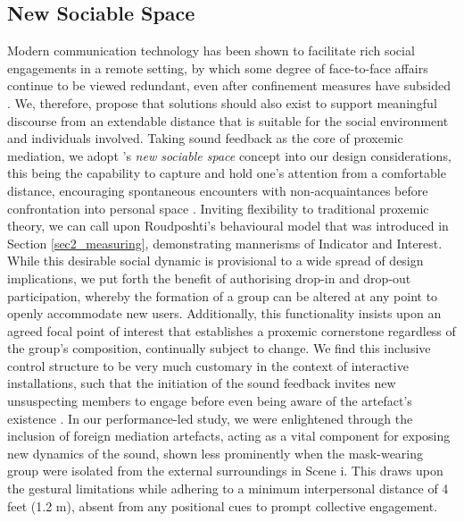 \subsection*{New Sociable Space}
Modern communication technology has been shown to facilitate rich social engagements in a remote setting, by which some degree of face-to-face affairs continue to be viewed redundant, even after confinement measures have subsided \citep{cotofan_work_2021}. We, therefore, propose that solutions should also exist to support meaningful discourse from an extendable distance that is suitable for the social environment and individuals involved. Taking sound feedback as the core of proxemic mediation, we adopt \citeauthor{mehta_new_2020}'s \textit{new sociable space} concept into our design considerations, this being the capability to capture and hold one's attention from a comfortable distance, encouraging spontaneous encounters with non-acquaintances before confrontation into personal space \cite{mehta_new_2020}. Inviting flexibility to traditional proxemic theory, we can call upon Roudposhti's behavioural model that was introduced in Section \ref{sec2_measuring}, demonstrating mannerisms of Indicator and Interest.
While this desirable social dynamic is provisional to a wide spread of design implications, we put forth the benefit of authorising drop-in and drop-out participation, whereby the formation of a group can be altered at any point to openly accommodate new users. Additionally, this functionality insists upon an agreed focal point of interest that establishes a proxemic cornerstone regardless of the group's composition, continually subject to change. We find this inclusive control structure to be very much customary in the context of interactive installations, such that the initiation of the sound feedback invites new unsuspecting members to engage before even being aware of the artefact's existence \citep{goudarzi_engagement_2016,rostami_bio-sensed_2017}. In our performance-led study, we were enlightened through the inclusion of foreign mediation artefacts, acting as a vital component for exposing new dynamics of the sound, shown less prominently when the mask-wearing group were isolated from the external surroundings in Scene i. This draws upon the gestural limitations while adhering to a minimum interpersonal distance of 4 feet (1.2 m), absent from any positional cues to prompt collective engagement.

